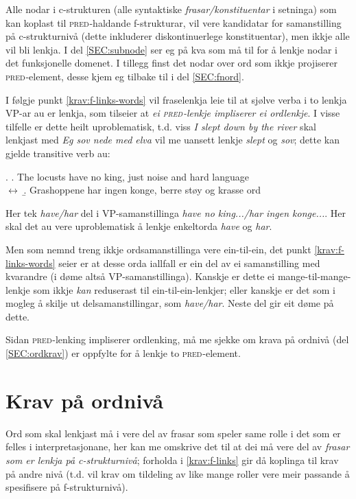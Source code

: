 \documentclass[12pt,a4paper,oneside,draft]{report}
\newcommand{\F}[2]{\textsc{#1}\ensuremath{_{#2}}}
\newcommand{\PRED}{\F{pred}{}}
\begin{document}
Alle nodar i c\hyp{}strukturen (alle syntaktiske \emph{frasar/konstituentar} i
setninga) som kan koplast til \PRED{}-haldande f\hyp{}strukturar, vil vere
kandidatar for samanstilling på c\hyp{}strukturnivå (dette inkluderer
diskontinuerlege konstituentar), men ikkje alle vil bli lenkja.  I del
\ref{SEC:subnode} ser eg på kva som må til for å lenkje nodar i det
funksjonelle domenet.  I tillegg finst det nodar over ord som ikkje
projiserer \PRED{}-element, desse kjem eg tilbake til i del
\ref{SEC:fnord}.

I følgje punkt \ref{krav:f-links-words} vil fraselenkja leie til at sjølve
verba i to lenkja VP-ar au er lenkja, som tilseier at \emph{ei \PRED{}-lenkje
impliserer ei ordlenkje}. I visse tilfelle er dette heilt
uproblematisk, t.d. viss \emph{I slept down by the river} skal lenkjast med
\emph{Eg sov nede med elva} vil me uansett lenkje \emph{slept} og \emph{sov}; dette
kan gjelde transitive verb au:

\ex. \a. The locusts have no king, just noise and hard language\\
     $\leftrightarrow$
     \b. Grashoppene har ingen konge, berre støy og krasse ord


Her tek \emph{have/har} del i VP-samanstillinga \emph{have no king.../har
 ingen konge...}. Her skal det au vere uproblematisk å lenkje
 enkeltorda \emph{have} og \emph{har}.

Men som nemnd treng ikkje ordsamanstillinga vere ein-til-ein, det
 punkt \ref{krav:f-links-words} seier er at desse orda iallfall er ein
 del av ei samanstilling med kvarandre (i døme \Last altså
 VP-samanstillinga). Kanskje er dette ei mange-til-mange-lenkje som
 ikkje \emph{kan} reduserast til ein-til-ein-lenkjer; eller kanskje er
 det som i \Last mogleg å skilje ut delsamanstillingar, som
 \emph{have/har}. Neste del gir eit døme på dette.

Sidan \PRED{}-lenking impliserer ordlenking, må me sjekke om krava
 på ordnivå (del \ref{SEC:ordkrav}) er oppfylte for å lenkje to
 \PRED{}-element.

\section{Krav på ordnivå}
\label{sec-3.5}

\label{SEC:ordkrav}

Ord som skal lenkjast må i \cite{thunes2003eal} vere del av frasar som
speler same rolle i det som er felles i interpretasjonane, her kan me
omskrive det til at dei må vere del av \emph{frasar som er lenkja på c\hyp{}strukturnivå}; forholda i \ref{krav:f-links} gir då koplinga til krav på
andre nivå (t.d. vil krav om tildeling av like mange roller vere
meir passande å spesifisere på f\hyp{}strukturnivå).
\end{document}
